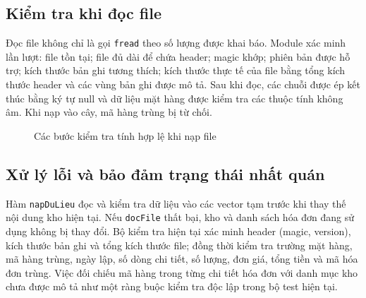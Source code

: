 \subsection{Kiểm tra khi đọc file}
Đọc file không chỉ là gọi \texttt{fread} theo số lượng được khai báo. Module xác minh lần lượt: file tồn tại; file đủ dài để chứa header; magic khớp; phiên bản được hỗ trợ; kích thước bản ghi tương thích; kích thước thực tế của file bằng tổng kích thước header và các vùng bản ghi được mô tả. Sau khi đọc, các chuỗi được ép kết thúc bằng ký tự null và dữ liệu mặt hàng được kiểm tra các thuộc tính không âm. Khi nạp vào cây, mã hàng trùng bị từ chối.

\begin{figure}[H]
\centering
{}
\caption{Các bước kiểm tra tính hợp lệ khi nạp file}
\label{fig:read_validation}
\end{figure}

\subsection{Xử lý lỗi và bảo đảm trạng thái nhất quán}
Hàm \texttt{napDuLieu} đọc và kiểm tra dữ liệu vào các vector tạm trước khi thay thế nội dung kho hiện tại. Nếu \texttt{docFile} thất bại, kho và danh sách hóa đơn đang sử dụng không bị thay đổi. Bộ kiểm tra hiện tại xác minh header (magic, version), kích thước bản ghi và tổng kích thước file; đồng thời kiểm tra trường mặt hàng, mã hàng trùng, ngày lập, số dòng chi tiết, số lượng, đơn giá, tổng tiền và mã hóa đơn trùng. Việc đối chiếu mã hàng trong từng chi tiết hóa đơn với danh mục kho chưa được mô tả như một ràng buộc kiểm tra độc lập trong bộ test hiện tại.

